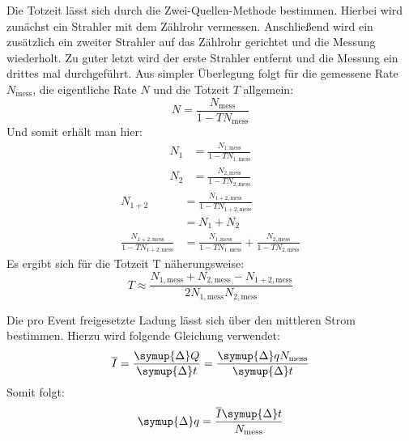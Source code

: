 Die Totzeit lässt sich durch die Zwei-Quellen-Methode bestimmen.
Hierbei wird zunächst ein Strahler mit dem Zählrohr vermessen. Anschließend wird ein zusätzlich ein zweiter Strahler 
auf das Zählrohr gerichtet und die Messung wiederholt.
Zu guter letzt wird der erste Strahler entfernt und die Messung ein drittes mal durchgeführt.
Aus simpler Überlegung folgt für die gemessene Rate $N_\text{mess}$, die eigentliche Rate $N$ und die Totzeit $T$ allgemein:
\begin{equation}
    N = \frac{N_\text{mess}}{1-TN_\text{mess}}
\end{equation}
Und somit erhält man hier:
\begin{align}
    N_1     &= \frac{N_{1,\text{mess}}}{1-TN_{1,\text{mess}}} \\
    N_2     &= \frac{N_{2,\text{mess}}}{1-TN_{2,\text{mess}}}
\end{align}
\begin{align}
    N_{1+2} &= \frac{N_{1+2,\text{mess}}}{1-TN_{1+2,\text{mess}}} \\
            &= N_1 + N_2 \\
    \frac{N_{1+2,\text{mess}}}{1-TN_{1+2,\text{mess}}} &=\frac{N_{1,\text{mess}}}{1-TN_{1,\text{mess}}} + \frac{N_{2,\text{mess}}}{1-TN_{2,\text{mess}}}
\end{align}
Es ergibt sich für die Totzeit T näherungsweise:
\begin{equation}
    \label{eqn:totzeit}
    T \approx \frac{N_{1,\text{mess}} + N_{2,\text{mess}} - N_{1+2,\text{mess}}}{2N_{1,\text{mess}}N_{2,\text{mess}}}
\end{equation}

Die pro Event freigesetzte Ladung lässt sich über den mittleren Strom bestimmen.
Hierzu wird folgende Gleichung verwendet:
\begin{equation}
    \overline{I} = \frac{\symup{\Delta}Q}{\symup{\Delta}t} = \frac{\symup{\Delta}q N_\text{mess}}{\symup{\Delta}t}
\end{equation}
Somit folgt:
\begin{equation}
    \label{eqn:ladung}
    \symup{\Delta}q = \frac{\overline{I} \symup{\Delta} t}{N_\text{mess}}
\end{equation}

